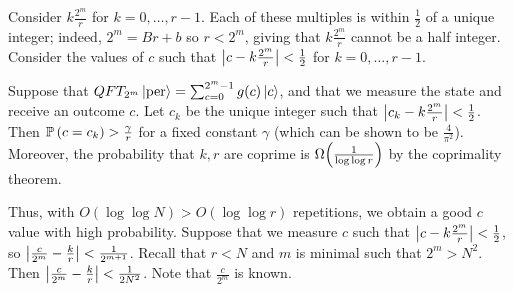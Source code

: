 Consider \( k\frac{2^m}{r} \) for \( k = 0, \dots, r-1 \).
Each of these multiples is within \( \frac{1}{2} \) of a unique integer; indeed, \( 2^m = Br + b \) so \( r < 2^m \), giving that \( k\frac{2^m}{r} \) cannot be a half integer.
Consider the values of \( c \) such that \( \abs{c - k \frac{2^m}{r}} < \frac{1}{2} \) for \( k = 0, \dots, r-1 \).
\begin{theorem}
    Suppose that \( QFT_{2^m} \ket{\mathrm{per}} = \sum_{c=0}^{2^m - 1} g(c) \ket{c} \), and that we measure the state and receive an outcome \( c \).
    Let \( c_k \) be the unique integer such that \( \abs{c_k - k\frac{2^m}{r}} < \frac{1}{2} \).
    Then \( \mathbb{P}\left({c = c_k}\right) > \frac{\gamma}{r} \) for a fixed constant \( \gamma \) (which can be shown to be \( \frac{4}{\pi^2} \)).
    Moreover, the probability that \( k, r \) are coprime is \( \Omega\qty(\frac{1}{\log \log r}) \) by the coprimality theorem.
\end{theorem}
Thus, with \( O(\log \log N) > O(\log \log r) \) repetitions, we obtain a good \( c \) value with high probability.
Suppose that we measure \( c \) such that \( \abs{c - k \frac{2^m}{r}} < \frac{1}{2} \), so \( \abs{\frac{c}{2^m} - \frac{k}{r}} < \frac{1}{2^{m+1}} \).
Recall that \( r < N \) and \( m \) is minimal such that \( 2^m > N^2 \).
Then \( \abs{\frac{c}{2^m} - \frac{k}{r}} < \frac{1}{2N^2} \).
Note that \( \frac{c}{2^m} \) is known.


